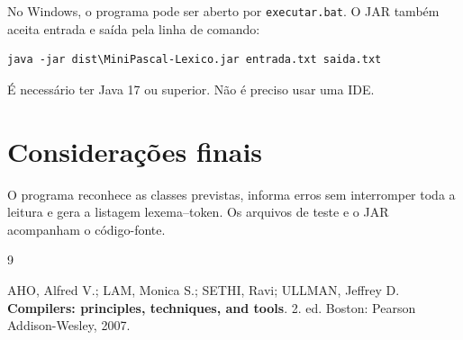 \documentclass[12pt,a4paper]{article}
\begin{document}
No Windows, o programa pode ser aberto por \texttt{executar.bat}. O JAR também aceita entrada e saída pela linha de comando:

\begin{lstlisting}
java -jar dist\MiniPascal-Lexico.jar entrada.txt saida.txt
\end{lstlisting}

É necessário ter Java 17 ou superior. Não é preciso usar uma IDE.

\section{Considerações finais}

O programa reconhece as classes previstas, informa erros sem interromper toda a leitura e gera a listagem lexema--token. Os arquivos de teste e o JAR acompanham o código-fonte.

\begin{thebibliography}{9}
\setlength{\itemsep}{0.4\baselineskip}

AHO, Alfred V.; LAM, Monica S.; SETHI, Ravi; ULLMAN, Jeffrey D. \textbf{Compilers: principles, techniques, and tools}. 2. ed. Boston: Pearson Addison-Wesley, 2007.

\end{thebibliography}
\end{document}
